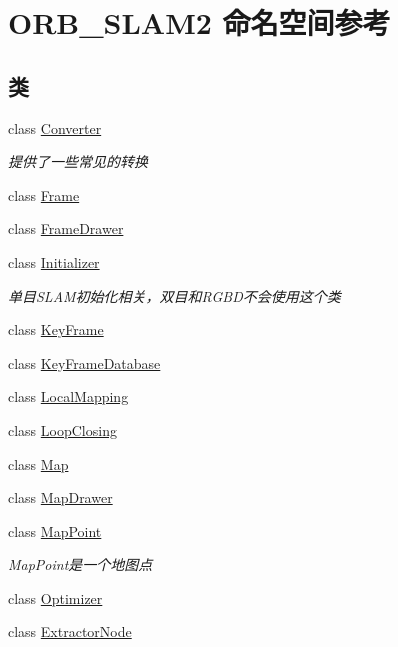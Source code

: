 \hypertarget{namespaceORB__SLAM2}{\section{O\-R\-B\-\_\-\-S\-L\-A\-M2 命名空间参考}
\label{namespaceORB__SLAM2}
}
\subsection*{类}
\begin{DoxyCompactItemize}
\item 
class \hyperlink{classORB__SLAM2_1_1Converter}{Converter}
\begin{DoxyCompactList}\small\item\em 提供了一些常见的转换 \end{DoxyCompactList}\item 
class \hyperlink{classORB__SLAM2_1_1Frame}{Frame}
\item 
class \hyperlink{classORB__SLAM2_1_1FrameDrawer}{Frame\-Drawer}
\item 
class \hyperlink{classORB__SLAM2_1_1Initializer}{Initializer}
\begin{DoxyCompactList}\small\item\em 单目\-S\-L\-A\-M初始化相关，双目和\-R\-G\-B\-D不会使用这个类 \end{DoxyCompactList}\item 
class \hyperlink{classORB__SLAM2_1_1KeyFrame}{Key\-Frame}
\item 
class \hyperlink{classORB__SLAM2_1_1KeyFrameDatabase}{Key\-Frame\-Database}
\item 
class \hyperlink{classORB__SLAM2_1_1LocalMapping}{Local\-Mapping}
\item 
class \hyperlink{classORB__SLAM2_1_1LoopClosing}{Loop\-Closing}
\item 
class \hyperlink{classORB__SLAM2_1_1Map}{Map}
\item 
class \hyperlink{classORB__SLAM2_1_1MapDrawer}{Map\-Drawer}
\item 
class \hyperlink{classORB__SLAM2_1_1MapPoint}{Map\-Point}
\begin{DoxyCompactList}\small\item\em Map\-Point是一个地图点 \end{DoxyCompactList}\item 
class \hyperlink{classORB__SLAM2_1_1Optimizer}{Optimizer}
\item 
class \hyperlink{classORB__SLAM2_1_1ExtractorNode}{Extractor\-Node}

\end{DoxyCompactItemize}
